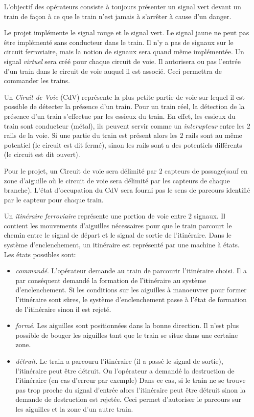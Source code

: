 L'objectif des opérateurs consiste à toujours présenter un signal vert devant un train de façon 
à ce que le train n'est jamais à s'arrêter à cause d'un danger.


\medskip
Le projet implémente le signal rouge et le signal vert. Le signal jaune ne peut pas être implémenté sans conducteur 
dans le train. Il n'y a pas de signaux sur le circuit ferroviaire, mais la notion de signaux sera quand même
implémentée. Un signal \emph{virtuel} sera créé pour chaque circuit de voie. Il autorisera ou pas l'entrée d'un train dans 
le circuit de voie auquel il est associé.
Ceci permettra de commander les trains. 

\medskip
Un \emph{Ciruit de Voie} (CdV) représente la plus petite partie de voie sur lequel il
est possible de détecter la présence d'un train. Pour un train réel, la détection de la 
présence d'un train s'effectue par les essieux du train. En effet, les essieux du train sont conducteur
(métal), ils peuvent servir comme un \emph{interupteur} entre les 2 rails de la voie. Si une partie du 
train est présent alors les 2 rails sont au même potentiel (le circuit est dit fermé), sinon les rails sont 
a des potentiels différents (le circuit est dit ouvert). 

\medskip
Pour le projet, un Circuit de voie sera délimité par 2 capteurs de passage(sauf en zone d'aiguille
où le circuit de voie sera délimité par les capteurs de chaque branche). L'état d'occupation du 
CdV sera fourni pas le sens de parcours identifié par le capteur pour chaque train.

\medskip
Un \emph{itinéraire ferroviaire} représente une portion de voie entre 2 signaux. Il contient les mouvements
d’aiguilles nécessaires pour que le train parcourt le chemin entre le signal de
départ et le signal de sortie de l'itinéraire. Dans le système d'enclenchement, un itinéraire
est représenté par une machine à états. Les états possibles sont:
\begin{itemize}
\item \emph{commandé}. L’opérateur demande au train de parcourir l’itinéraire
choisi. Il a par conséquent demandé la formation de l’itinéraire au
système d’enclenchement. Si les conditions sur les aiguilles à manoeuvrer
pour former l’itinéraire sont sûres, le système d’enclenchement
passe à l’état de formation de l’itinéraire sinon il est rejeté.
\item \emph{formé}. Les aiguilles sont positionnées dans la bonne direction. Il n’est
plus possible de bouger les aiguilles tant que le train se situe dans une
certaine zone.
\item \emph{détruit}. Le train a parcouru l’itinéraire (il a passé le signal de sortie), l'itinéraire peut
 être détruit. Ou l'opérateur a demandé la destruction de l'itinéraire (en cas d'erreur par exemple)
Dans ce cas, si le train ne se trouve pas trop proche du signal d'entrée alors l'itinéraire peut 
être détruit sinon la demande de destruction est rejetée. 
Ceci permet d'autoriser le parcours sur les aiguilles et la zone d’un autre train. 
\end{itemize}


